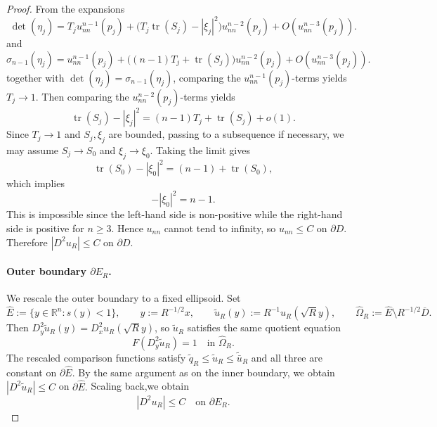 \documentclass[reqno,a4paper]{amsart}
\numberwithin{equation}{section}
\begin{document}
\begin{proof}
		From the expansions
		\begin{equation}
			\det(\eta_j)
			=
			T_j u_{nn}^{n-1}(p_j)
			+
			\bigl(T_j\operatorname{tr}(S_j)-|\xi_j|^2\bigr)u_{nn}^{n-2}(p_j)
			+
			O(u_{nn}^{n-3}(p_j)).
		\end{equation}
		and
		\begin{equation}
			\sigma_{n-1}(\eta_j)
			=
			u_{nn}^{n-1}(p_j)
			+
			\bigl((n-1)T_j+\operatorname{tr}(S_j)\bigr)u_{nn}^{n-2}(p_j)
			+
			O(u_{nn}^{n-3}(p_j)).
		\end{equation}
		together with $\det(\eta_j)=\sigma_{n-1}(\eta_j)$, comparing the $u_{nn}^{n-1}(p_j)$-terms yields $T_j\to1$. Then comparing the $u_{nn}^{n-2}(p_j)$-terms yields
		\[
		\operatorname{tr}(S_j)-|\xi_j|^2 = (n-1)T_j+\operatorname{tr}(S_j)+o(1).
		\]
		Since $T_j\to1$ and $S_j,\xi_j$ are bounded, passing to a subsequence if necessary, we may assume $S_j\to S_0$ and $\xi_j\to\xi_0$. Taking the limit gives
		\[
		\operatorname{tr}(S_0)-|\xi_0|^2 = (n-1)+\operatorname{tr}(S_0),
		\]
		which implies
		\begin{equation}
			-|\xi_0|^2 = n-1.
		\end{equation}
		This is impossible since the left-hand side is non-positive while the right-hand side is positive for $n\ge3$. Hence $u_{nn}$ cannot tend to infinity, so $u_{nn}\le C$ on $\partial D$. Therefore $|D^2u_R|\le C$ on $\partial D$.
		\paragraph{Outer boundary $\partial E_R$.}
		We rescale the outer boundary to a fixed ellipsoid. Set
		\[
		\widehat{E} := \{ y \in \mathbb{R}^n : s(y) < 1 \}, \qquad y := R^{-1/2} x,
		\qquad \widetilde{u}_R(y) := R^{-1} u_R(\sqrt{R} y), \qquad \widehat{\Omega}_R := \widehat{E} \setminus R^{-1/2} \overline{D}.
		\]
		Then $D_y^2 \widetilde{u}_R(y) = D_x^2 u_R(\sqrt{R} y)$, so $\widetilde{u}_R$ satisfies the same quotient equation
		\[
		F(D_y^2 \widetilde{u}_R) = 1 \quad \text{in } \widehat{\Omega}_R.
		\]
		The rescaled comparison functions satisfy $\widetilde{q}_R \le \widetilde{u}_R \le \widetilde{\bar{u}}_R$ and all three are constant on $\partial \widehat{E}$. By the same argument as on the inner boundary, we obtain
		$|D^2 \widetilde{u}_R|\le C$ on $ \partial \widehat{E}.$
		Scaling back,we obtain
		\begin{equation}
			|D^2 u_R| \le C \quad \text{on } \partial E_R.
		\end{equation}
	\end{proof}
	
\end{document}
